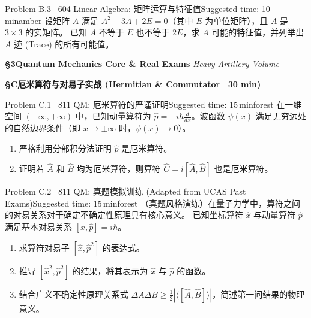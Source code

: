 \documentclass[a4paper,11pt]{article}
\begin{document}
\clearpage
\begin{problembox}{Problem B.3 \textbar\ 604 Linear Algebra: 矩阵运算与特征值}{Suggested time: 10\,min}{amber}
设矩阵 $A$ 满足 $A^2 - 3A + 2E = 0$（其中 $E$ 为单位矩阵），且 $A$ 是 $3 \times 3$ 的实矩阵。
已知 $A$ 不等于 $E$ 也不等于 $2E$，求 $A$ 可能的特征值，并列举出 $A$ 迹 (Trace) 的所有可能值。
\end{problembox}
\vspace{10.0cm}

\clearpage

{\Large\sffamily\bfseries\color{navy} \S 3\quad Quantum Mechanics Core \& Real Exams}
\hfill{\small\sffamily\color{mist}\itshape Heavy Artillery Volume}

\vspace{6pt}
{\normalsize\sffamily\bfseries\color{forest} \S C\quad 厄米算符与对易子实战 (Hermitian \& Commutator \textperiodcentered\ 30 min)}
\vspace{2pt}

\begin{problembox}{Problem C.1 \textbar\ 811 QM: 厄米算符的严谨证明}{Suggested time: 15\,min}{forest}
在一维空间 $(-\infty, +\infty)$ 中，已知动量算符为 $\hat{p} = -i\hbar \frac{d}{dx}$。波函数 $\psi(x)$ 满足无穷远处的自然边界条件（即 $x \to \pm\infty$ 时，$\psi(x) \to 0$）。
\begin{enumerate}
    \item 严格利用分部积分法证明 $\hat{p}$ 是厄米算符。
    \item 证明若 $\hat{A}$ 和 $\hat{B}$ 均为厄米算符，则算符 $\hat{C} = i[\hat{A}, \hat{B}]$ 也是厄米算符。
\end{enumerate}
\end{problembox}
\vspace{10.0cm}

\clearpage
\begin{problembox}{Problem C.2 \textbar\ 811 QM: 真题模拟训练 (Adapted from UCAS Past Exams)}{Suggested time: 15\,min}{forest}
（真题风格演练）在量子力学中，算符之间的对易关系对于确定不确定性原理具有核心意义。
已知坐标算符 $\hat{x}$ 与动量算符 $\hat{p}$ 满足基本对易关系 $[\hat{x}, \hat{p}] = i\hbar$。
\begin{enumerate}
    \item 求算符对易子 $[\hat{x}, \hat{p}^2]$ 的表达式。
    \item 推导 $[\hat{x}^2, \hat{p}^2]$ 的结果，将其表示为 $\hat{x}$ 与 $\hat{p}$ 的函数。
    \item 结合广义不确定性原理关系式 $\Delta A \Delta B \ge \frac{1}{2}|\langle [\hat{A}, \hat{B}] \rangle|$，简述第一问结果的物理意义。
\end{enumerate}
\end{problembox}
\vspace{12.0cm}
\end{document}
